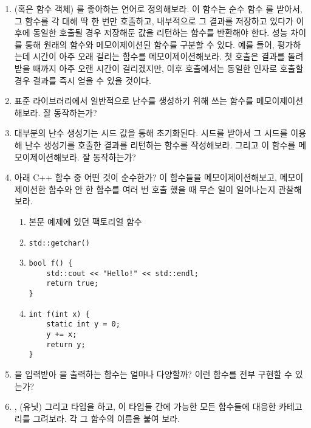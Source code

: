 \begin{enumerate}
\tightlist
\item
  \trHigherOrderFunction (혹은 함수 객체) 를 좋아하는 언어로 정의해보라.
  이 함수는 순수 함수 를 \trArgument\로 받아서, 그 함수를 각  대해 딱 한 번만 호출하고, 내부적으로 그 결과를 저장하고 있다가 이후에 동일한 \trArgument\로 호출될 경우 저장해둔 값을 리턴하는 함수를 반환해야 한다.
  성능 차이를 통해 원래의 함수와 메모이제이션된 함수를 구분할 수 있다. 예를 들어, 평가하는데 시간이 아주 오래 걸리는 함수를 메모이제이션해보라.
  첫 호출은 결과를 돌려받을 때까지 아주 오랜 시간이 걸리겠지만, 이후 호출에서는 동일한 인자로 호출할 경우 결과를 즉시 얻을 수 있을 것이다.
\item
  표준 라이브러리에서 일반적으로 난수를 생성하기 위해 쓰는 함수를 메모이제이션해보라. 잘 동작하는가?
\item
  대부분의 난수 생성기는 시드 값을 통해 초기화된다. 시드를 받아서 그 시드를 이용해 난수 생성기를 호출한 결과를 리턴하는 함수를 작성해보라. 그리고 이 함수를 메모이제이션해보라. 잘 동작하는가?
\item
  아래 C++ 함수 중 어떤 것이 순수한가? 이 함수들을 메모이제이션해보고, 메모이제이션한 함수와 안 한 함수를 여러 번 호출 했을 때 무슨 일이 일어나는지 관찰해보라. 

  \begin{enumerate}
  \tightlist
  \item
    본문 예제에 있던 팩토리얼 함수
  \item
\begin{verbatim}
std::getchar()
\end{verbatim}
  \item
\begin{verbatim}
bool f() { 
    std::cout << "Hello!" << std::endl;
    return true;
}
\end{verbatim}
  \item
\begin{verbatim}
int f(int x) {
    static int y = 0;
    y += x;
    return y;
}
\end{verbatim}
  \end{enumerate}
\item
  을 입력받아 을 출력하는 함수는 얼마나 다양할까? 이런 함수를 전부 구현할 수 있는가?
\item
  , \code{()} (유닛) 그리고  타입을 \trObject\로 하고, 이 타입들 간에 가능한 모든 함수들에 \trArrow\를 대응한 카테고리를 그려보라. 각  그 함수의 이름을 붙여 보라.
\end{enumerate}
